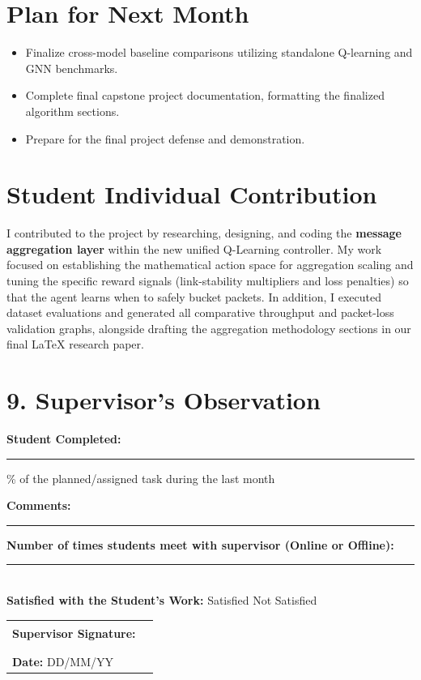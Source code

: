 \documentclass[12pt,a4paper]{article}
\begin{document}
\section{Plan for Next Month}
\begin{itemize}[leftmargin=*]
    \item Finalize cross-model baseline comparisons utilizing standalone Q-learning and GNN benchmarks.
    \item Complete final capstone project documentation, formatting the finalized algorithm sections.
    \item Prepare for the final project defense and demonstration.
\end{itemize}

\section{Student Individual Contribution}
I contributed to the project by researching, designing, and coding the \textbf{message aggregation layer} within the new unified Q-Learning controller. My work focused on establishing the mathematical action space for aggregation scaling and tuning the specific reward signals (link-stability multipliers and loss penalties) so that the agent learns when to safely bucket packets. In addition, I executed dataset evaluations and generated all comparative throughput and packet-loss validation graphs, alongside drafting the aggregation methodology sections in our final LaTeX research paper.

\section*{9. Supervisor’s Observation}

\noindent\textbf{Student Completed:} \rule{3cm}{0.4pt}\% 
of the planned/assigned task during the last month

\vspace{0.5cm}

\noindent\textbf{Comments:}

\vspace{2cm}
\noindent\rule{\textwidth}{0.4pt}

\vspace{0.5cm}

\noindent\textbf{Number of times students meet with supervisor (Online or Offline):} \rule{1cm}{0.4pt} \\                                                       
\noindent\textbf{Satisfied with the Student's Work:} 
\hspace{0.5cm}  Satisfied 
\hspace{1cm}  Not Satisfied

\vspace{1.5cm}

\noindent\begin{tabular}{p{7cm} p{6cm}}
\textbf{Supervisor Signature:} & \rule{5cm}{0.4pt} \\
\\
\textbf{Date:} DD/MM/YY
\end{tabular}
\end{document}
